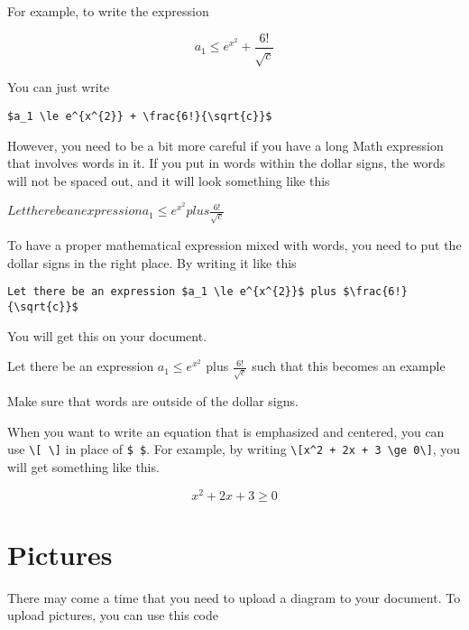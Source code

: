 \documentclass[11pt]{article}
\begin{document}
For example, to write the expression

\[a_1 \le e^{x^{2}} + \frac{6!}{\sqrt{c}}\]

You can just write
\vspace{3mm}
\begin{center}
    \verb|$a_1 \le e^{x^{2}} + \frac{6!}{\sqrt{c}}$|
\end{center}

However, you need to be a bit more careful if you have a long Math expression that involves words in it. If you put in words within the dollar signs, the words will not be spaced out, and it will look something like this

\begin{center}
        $Let there be an expression a_1 \le e^{x^{2}} plus \frac{6!}{\sqrt{c}}$
\end{center}

To have a proper mathematical expression mixed with words, you need to put the dollar signs in the right place. By writing it like this

\begin{center}
    \verb |Let there be an expression $a_1 \le e^{x^{2}}$ plus $\frac{6!}{\sqrt{c}}$|
\end{center}

You will get this on your document.

\begin{center}
    Let there be an expression $a_1 \le e^{x^{2}}$ plus $\frac{6!}{\sqrt{c}}$ such that this becomes an example
\end{center}

Make sure that words are outside of the dollar signs.
\vspace{3mm}

When you want to write an equation that is emphasized and centered, you can use \verb|\[ \]| in place of \verb|$ $|. For example, by writing \verb|\[x^2 + 2x + 3 \ge 0\]|, you will get something like this.

\[x^2 + 2x + 3 \ge 0\]
\pagebreak{}

\section{Pictures}

There may come a time that you need to upload a diagram to your document. To upload pictures, you can use this code
\end{document}
